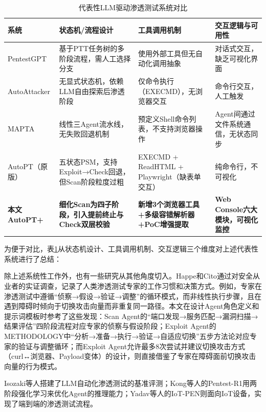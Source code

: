 \begin{table}[htbp]
\centering
\caption{代表性LLM驱动渗透测试系统对比} \label{tab:literature_comparison}
  \renewcommand{\arraystretch}{1.3}
\begin{tabular}{>{\raggedright\arraybackslash}p{2cm}>{\raggedright\arraybackslash}p{3cm}>{\raggedright\arraybackslash}p{3cm}>{\raggedright\arraybackslash}p{4cm}}
    \toprule
系统 & 状态机/流程设计 & 工具调用机制 & 交互逻辑与可用性 \\
    \midrule
PentestGPT & 基于PTT任务树的多阶段流程，需人工选择分支 & 使用外部工具但无自动化调用抽象 & 对话式交互，缺乏可视化界面 \\
    \midrule
AutoAttacker & 无显式状态机，依赖LLM自由探索后渗透阶段 & 仅命令执行（EXECMD），无浏览器交互 & 命令行交互，人工触发 \\
    \midrule
MAPTA & 线性三Agent流水线，无失败回退机制 & 预定义Shell命令列表，不支持浏览器操作 & Agent间通过文件系统通信，无状态同步 \\
    \midrule
AutoPT（原版）& 五状态PSM，支持Exploit→Check回退，但Scan阶段粒度过粗 & EXECMD + ReadHTML + Playwright（缺表单交互） & 纯命令行，不可视化 \\
    \midrule
\textbf{本文AutoPT+} & \textbf{细化Scan为四子阶段，引入提前终止与Check双层校验} & \textbf{新增3个浏览器工具+多级容错解析器+PoC增强提取} & \textbf{Web Console六大模块，可视化监控} \\
    \bottomrule
\end{tabular}
\end{table}

为便于对比，表\ref{tab:literature_comparison}从状态机设计、工具调用机制、交互逻辑三个维度对上述代表性系统进行了总结：

除上述系统性工作外，也有一些研究从其他角度切入。Happe和Cito\cite{Happe2023Understanding}通过对安全从业者的实证调查，记录了人类渗透测试专家的工作习惯和决策方式。例如，专家在渗透测试中遵循“侦察→假设→验证→调整”的循环模式，而非线性执行步骤，且在遇到障碍时倾向于切换攻击向量而非重复同一路径。本文在设计Agent角色定义和提示词模板时参考了这些发现：Scan Agent的“端口发现→服务匹配→漏洞扫描→结果评估”四阶段流程对应专家的侦察与假设阶段；Exploit Agent的METHODOLOGY中“分析→准备→执行→验证→自适应切换”五步方法论对应专家的验证与调整循环；而Exploit Agent允许最多8次尝试并建议切换攻击方式（curl↔浏览器、Payload变体）的设计，则直接借鉴了专家在障碍面前切换攻击向量的行为模式。

Isozaki等人\cite{Isozaki2025Towards}搭建了LLM自动化渗透测试的基准评测；Kong等人\cite{Kong2025PentestR1}的Pentest-R1用两阶段强化学习来优化Agent的推理能力；Yadav等人\cite{Yadav2020IoTPEN}的IoT-PEN则面向IoT设备，实现了端到端的渗透测试流程。

